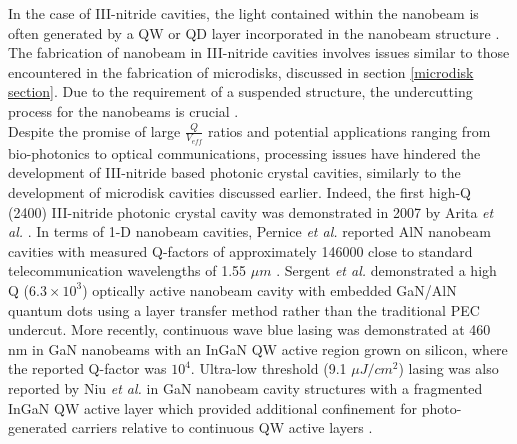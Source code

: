 In the case of III-nitride cavities, the light contained within the nanobeam is often generated by a QW or QD layer incorporated in the nanobeam structure \cite{Trivino2015,Niu2015}. The fabrication of nanobeam in III-nitride cavities involves issues similar to those encountered in the fabrication of microdisks, discussed in section \ref{microdisk section}. Due to the requirement of a suspended structure, the undercutting process for the nanobeams is crucial \cite{Trivino2015}.\\
Despite the promise of large $\frac{Q}{V_{eff}}$ ratios and potential applications ranging from bio-photonics to optical communications, processing issues have hindered the development of III-nitride based photonic crystal cavities, similarly to the development of microdisk cavities discussed earlier. Indeed, the first high-Q (2400) III-nitride photonic crystal cavity was demonstrated in 2007 by Arita {\it et al.} \cite{Arita2007}. In terms of 1-D nanobeam cavities, Pernice {\it et al.} reported AlN nanobeam cavities with measured Q-factors of approximately 146000 close to standard telecommunication wavelengths of 1.55 $\mu m$ \cite{Pernice2012}. Sergent {\it et al.} demonstrated a high Q ($6.3 \times 10^{3}$) optically active nanobeam cavity with embedded GaN/AlN quantum dots using a layer transfer method rather than the traditional PEC undercut. More recently, continuous wave blue lasing was demonstrated at 460 nm in GaN nanobeams with an InGaN QW active region  grown on silicon, where the reported Q-factor was $ 10^{4}$. Ultra-low threshold (9.1 $\mu J/cm^{2}$) lasing was also reported by Niu \textit{et al.} in GaN nanobeam cavity structures with a fragmented InGaN QW active layer which provided additional confinement for photo-generated carriers relative to continuous QW active layers \cite{Niu2015}.

